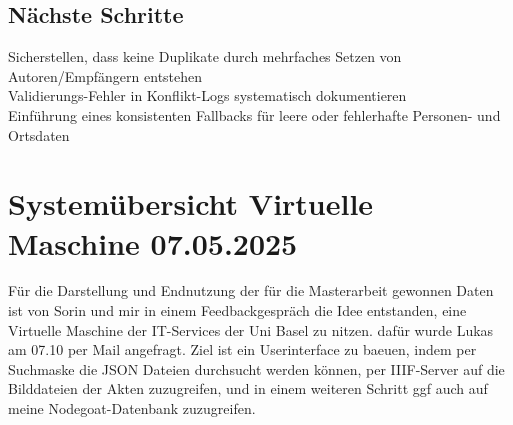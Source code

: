 \documentclass{article}
\begin{document}
\subsection*{Nächste Schritte}
 Sicherstellen, dass keine Duplikate durch mehrfaches Setzen von Autoren/Empfängern entstehen\\
 Validierungs-Fehler in Konflikt-Logs systematisch dokumentieren\\
 Einführung eines konsistenten Fallbacks für leere oder fehlerhafte Personen- und Ortsdaten\\

\section{Systemübersicht Virtuelle Maschine \small 07.05.2025}

Für die Darstellung und Endnutzung der für die Masterarbeit gewonnen Daten ist von Sorin und mir in einem Feedbackgespräch die Idee entstanden, eine Virtuelle Maschine der IT-Services der Uni Basel zu nitzen. dafür wurde Lukas  am 07.10 per Mail angefragt. Ziel ist ein Userinterface zu baeuen, indem per Suchmaske die JSON Dateien durchsucht werden können, per IIIF-Server auf die Bilddateien der Akten zuzugreifen, und in einem weiteren Schritt ggf auch auf meine Nodegoat-Datenbank zuzugreifen.

\begin{center}
\end{center}
\end{document}

